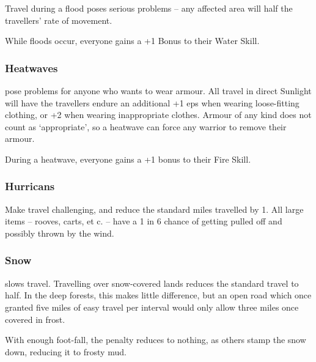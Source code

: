 \begin{multicols}{2}
Travel during a flood poses serious problems -- any affected area will half the travellers' rate of movement.

While floods occur, everyone gains a +1 Bonus to their Water Skill.

\subsubsection{Heatwaves}
pose problems for anyone who wants to wear armour.
All travel in direct Sunlight will have the travellers endure an additional +1 \glspl{ep} when wearing loose-fitting clothing, or +2 when wearing inappropriate clothes.
Armour of any kind does not count as `appropriate', so a heatwave can force any warrior to remove their armour.

During a heatwave, everyone gains a +1 bonus to their Fire Skill.

\subsubsection{Hurricans}
Make travel challenging, and reduce the standard miles travelled by 1.
All large items -- rooves, carts, et c. -- have a 1 in 6 chance of getting pulled off and possibly thrown by the wind.

\subsubsection{Snow}
slows travel.
Travelling over snow-covered lands reduces the standard travel to half.
In the deep forests, this makes little difference, but an open road which once granted five miles of easy travel per \gls{interval} would only allow three miles once covered in frost.

With enough foot-fall, the penalty reduces to nothing, as others stamp the snow down, reducing it to frosty mud.



\end{multicols}
